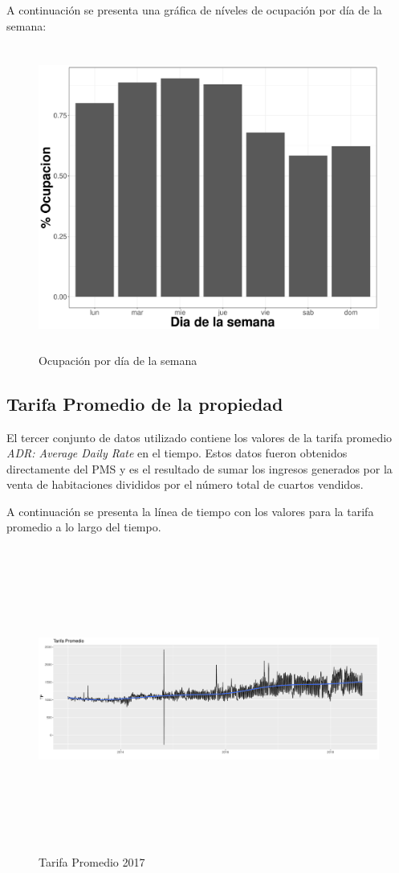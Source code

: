 A continuación se presenta una gráfica de níveles de ocupación por día de la semana:

\begin{figure}[H]
  \centering
      \includegraphics[width=\maxwidth,height=10cm]{Figures/Ocupacion_Dia_Semana-1}   
  \caption{Ocupación por día de la semana}
\end{figure}



\subsection*{Tarifa Promedio de la propiedad}

El tercer conjunto de datos utilizado contiene los valores de la tarifa promedio \emph{ADR: Average Daily Rate} en el tiempo. Estos datos fueron obtenidos directamente del PMS y es el resultado de sumar los ingresos generados por la venta de habitaciones divididos por el número total de cuartos vendidos. 

A continuación se presenta la línea de tiempo con los valores para la tarifa promedio a lo largo del tiempo.

\begin{figure}[H]
  \centering
      \includegraphics[width=\maxwidth,height=10cm]{figures/IndicadoresTarifaPromedio-1}    
  \caption{Tarifa Promedio 2017}
\end{figure}


